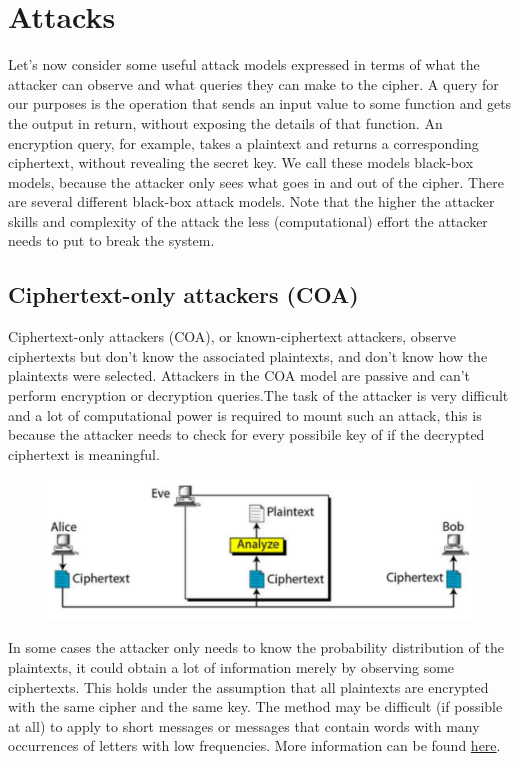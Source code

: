 \section{Attacks}
Let’s now consider some useful attack models expressed in terms of what the attacker can observe and what queries they can make to the cipher. A query for our purposes is the operation that sends an input value to some function and gets the output in return, without exposing the details of that function. An encryption query, for example, takes a plaintext and returns a corresponding ciphertext, without revealing the secret key. We call these models black-box models, because the attacker only sees what goes in and out of the cipher.
There are several different black-box attack models.  Note that the higher the attacker skills and complexity of the attack the less (computational) effort the attacker needs to put to break the system.

	\subsection{Ciphertext-only attackers (COA)}
	Ciphertext-only attackers (COA), or known-ciphertext attackers, observe ciphertexts but don’t know the 	associated plaintexts, and don’t know how the plaintexts were selected. Attackers in the COA model are passive and can’t perform encryption or decryption queries.The task of the attacker is very difficult and a lot of computational power is required to mount such an attack, this is because the attacker needs to check for every possibile key of if the decrypted ciphertext is meaningful.
	\begin{figure}
		\centering
		\includegraphics[width=0.7\linewidth]{Images/Chapter1/screenshot001}
		\caption{}
		\label{fig:chapter1_screenshot001}
	\end{figure}
	
	In some cases the attacker only needs to know the probability distribution of the plaintexts, it could obtain a lot of information merely by observing some ciphertexts. This holds under the assumption that all plaintexts are encrypted with the same cipher and the same key. The method may be difficult (if possible at all) to apply to short messages or messages that contain words with many occurrences of letters with low frequencies. More information can be found \href{https://crypto.interactive-maths.com/frequency-analysis-breaking-the-code.html}{here}.


